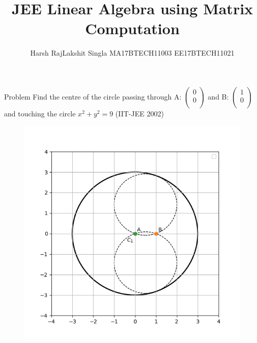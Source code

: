 \documentclass[10pt]{beamer}
\title{JEE Linear Algebra using Matrix Computation}
\subtitle{}
\date{}
\author{\quad Harsh Raj\qquad \qquad \qquad \qquad Lakshit Singla \newline MA17BTECH11003 \quad \qquad \qquad EE17BTECH11021}
\begin{document}
\maketitle

\begin{frame}{Problem}
Find the centre of the circle passing through A: \( \left( {\begin{array}{c}
   0 \\
   0 \\
   \end{array} } \right)\) and B: \( \left( {\begin{array}{c}
   1 \\
   0 \\
   \end{array} } \right)\) and touching the circle \(x^2 + y^2 = 9\)\qquad
   (IIT-JEE 2002)
 \begin{figure}[h]
\includegraphics[scale = 0.45]{s1_im1_question.png}

\end{figure}

\end{frame}
\end{document}
